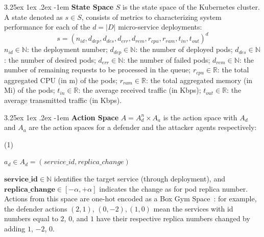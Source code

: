 \documentclass[conference]{IEEEtran}
\makeatletter
\renewcommand\paragraph{\@startsection{paragraph}{5}{\z@}%
  {3.25ex \@plus1ex \@minus.2ex}%
  {-1em}%
  {\normalfont\normalsize\bfseries}}
\makeatother
\begin{document}
\noindent \paragraph{\textbf{State Space}} $S$ is the state space of the Kubernetes cluster. A state denoted as $s \in S$, consists of metrics to characterizing system performance for each of the $d = |D|$ micro-service deployments:
$$
    s = (n_{id}, d_{dep}, d_{des}, d_{err}, d_{rem}, r_{cpu}, r_{ram}, t_{in}, t_{out})^d
$$
$n_{id} \in \mathbb{N}$: the deployment number; \quad
$d_{dep} \in \mathbb{N}$: the number of deployed pods; \quad
$d_{des} \in \mathbb{N}$: the number of desired pods; \quad
$d_{err} \in \mathbb{N}$: the number of failed pods; \quad
$d_{rem} \in \mathbb{N}$: the number of remaining requests to be processed in the queue; \quad
$r_{cpu} \in \mathbb{R}$: the total aggregated CPU (in m) of the pods; \quad
$r_{ram} \in \mathbb{R}$: the total aggregated memory (in Mi) of the pods; \quad
$t_{in} \in \mathbb{R}$: the average received traffic (in Kbps); \quad
$t_{out} \in \mathbb{R}$: the average transmitted traffic (in Kbps).


\noindent \paragraph{\textbf{Action Space}} $A = A_d^n \times A_a$ is the action space with $A_d$ and $A_a$ are the action spaces for a defender and the attacker agents respectively:

\vspace{0.3cm}

\indent\begin{minipage}{0.15\linewidth}
    (1)
\end{minipage}
\begin{minipage}{0.9\linewidth}
    \raggedright
    $\displaystyle a_d \in A_d = (service\_id, replica\_change)$
\end{minipage}

\vspace{0.3cm}

\indent $\mathbf{service\_id} \in \mathbb{N}$ identifies the target service (through deployment), and $\mathbf{replica\_change} \in [-\alpha, +\alpha]$ indicates the change as for pod replica number. Actions from this space are one-hot encoded as a Box Gym Space~\cite{openAIGymActionSpaces}: for example, the defender actions $(2,1)$, $(0,-2), (1,0)$ mean the services with id numbers equal to $2$, $0$, and $1$ have their respective replica numbers changed by adding $1$, $-2$, $0$.
\end{document}
